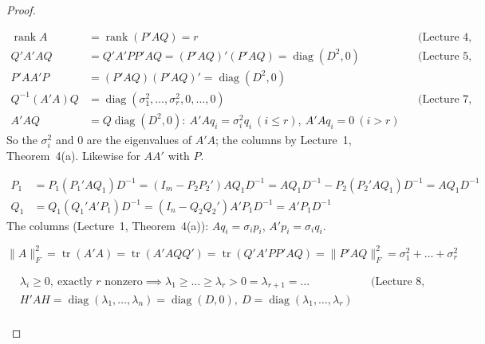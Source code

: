 \documentclass[12pt]{article}
\DeclareMathOperator{\tr}{tr}
\DeclareMathOperator{\diag}{diag}
\DeclareMathOperator{\rank}{rank}
\theoremstyle{definition}
\newcommand{\lec}[1]{Lecture~#1}
\newcommand{\boardtop}{\vspace*{-\abovedisplayskip}}
\begin{document}
\begin{proof}
\begin{board}[(a), (b) \(PP'=I_m\), \(QQ'=I_n\), \(Q^{-1}=Q'\) (\lec{6}, Theorem~9); the nonzero columns
\(\sigma_1e_1,\dots,\sigma_re_r\) of \(P'AQ\) are independent (\lec{6}, Theorem~7(b)) and span \(\mathcal C(P'AQ)\):]
\boardtop
\begin{align*}
\rank A&=\rank(P'AQ)=r&&\text{(\lec{4}, Theorem~15(d))}\\
Q'A'AQ&=Q'A'PP'AQ=(P'AQ)'(P'AQ)=\diag(D^2,0)&&\text{(\lec{5}, Theorem~2)}\\
P'AA'P&=(P'AQ)(P'AQ)'=\diag(D^2,0)\\
Q^{-1}(A'A)Q&=\diag(\sigma_1^2,\dots,\sigma_r^2,0,\dots,0)&&\text{(\lec{7}, Theorem~14(a))}\\
A'AQ&=Q\diag(D^2,0)\colon\ A'Aq_i=\sigma_i^2q_i\ (i\leqslant r),\ A'Aq_i=0\ (i>r)
\end{align*}
So the \(\sigma_i^2\) and \(0\) are the eigenvalues of \(A'A\); the columns by \lec{1}, Theorem~4(a). Likewise for
\(AA'\) with \(P\).
\end{board}
\begin{board}[(c) \(PP'=P_1P_1'+P_2P_2'=I_m\), \(QQ'=Q_1Q_1'+Q_2Q_2'=I_n\); \(P_1'AQ_1=D\), \(P_2'AQ_1=0\),
\(P_1'AQ_2=0\) are blocks of \(P'AQ\), and \(Q_1'A'P_1=(P_1'AQ_1)'=D\), \(Q_2'A'P_1=(P_1'AQ_2)'=0\):]
\boardtop
\begin{align*}
P_1&=P_1(P_1'AQ_1)D^{-1}=(I_m-P_2P_2')AQ_1D^{-1}=AQ_1D^{-1}-P_2(P_2'AQ_1)D^{-1}=AQ_1D^{-1}\\
Q_1&=Q_1(Q_1'A'P_1)D^{-1}=(I_n-Q_2Q_2')A'P_1D^{-1}=A'P_1D^{-1}
\end{align*}
The columns (\lec{1}, Theorem~4(a)): \(Aq_i=\sigma_ip_i\), \(A'p_i=\sigma_iq_i\).
\end{board}
\begin{board}[(d) \lec{1}, Theorem~10(b),(c), and \(QQ'=I_n\), \(PP'=I_m\):]
\[
\lVert A\rVert_F^2=\tr(A'A)=\tr(A'AQQ')=\tr(Q'A'PP'AQ)=\lVert P'AQ\rVert_F^2=\sigma_1^2+\dots+\sigma_r^2
\]
\end{board}
\begin{board}[(e) \(A\ne0\) PSD; \(H\), \(\lambda_i\): the \(Q\), \(\lambda_i\) of \lec{9}, Theorem~13, for \(A\);
\(r=\rank A\):]
\boardtop
\begin{align*}
&\lambda_i\geqslant0,\ \text{exactly \(r\) nonzero}\implies\lambda_1\geqslant\dots\geqslant\lambda_r>0=\lambda_{r+1}=\dots
&&\text{(\lec{8}, Theorems~14(a), 9(b))}\\
&H'AH=\diag(\lambda_1,\dots,\lambda_n)=\diag(D,0),\ D=\diag(\lambda_1,\dots,\lambda_r)\\

\end{align*}
\end{board}
\end{proof}
\end{document}
